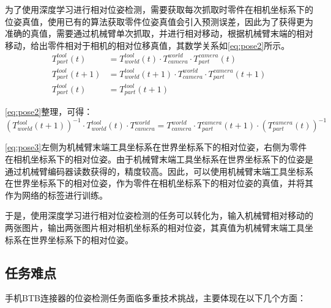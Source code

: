 \documentclass{Diploma}
\begin{document}
为了使用深度学习进行相对位姿检测，需要获取每次抓取时零件在相机坐标系下的位姿真值，使用已有的算法获取零件位姿真值会引入预测误差，因此为了获得更为准确的真值，需要通过机械臂单次抓取，并进行相对移动，根据机械臂末端的相对移动，给出零件相对于相机的相对位移真值，其数学关系如\eqref{eq:pose2}所示。
\begin{equation} \label{eq:pose2}
\begin{aligned} 
  T_{part}^{tool}(t) &= T_{world}^{tool}(t) \cdot T_{camera}^{world} \cdot T_{part}^{camera}(t)  \\
  T_{part}^{tool}(t+1) &= T_{world}^{tool}(t+1) \cdot T_{camera}^{world} \cdot T_{part}^{camera}(t+1) \\
  T_{part}^{tool}(t) &= T_{part}^{tool}(t+1) 
\end{aligned}
\end{equation}

\eqref{eq:pose2}整理，可得：
\begin{equation} \label{eq:pose3}
    (T_{world}^{tool}(t+1))^{-1} \cdot T_{world}^{tool}(t) \cdot T_{camera}^{world} = T_{camera}^{world} \cdot T_{part}^{camera}(t+1) \cdot (T_{part}^{camera}(t))^{-1}
\end{equation}

\eqref{eq:pose3}左侧为机械臂末端工具坐标系在世界坐标系下的相对位姿，右侧为零件在相机坐标系下的相对位姿。由于机械臂末端工具坐标系在世界坐标系下的位姿是通过机械臂编码器读数获得的，精度较高。因此，可以使用机械臂末端工具坐标系在世界坐标系下的相对位姿，作为零件在相机坐标系下的相对位姿的真值，并将其作为网络的标签进行训练。

于是，使用深度学习进行相对位姿检测的任务可以转化为，输入机械臂相对移动的两张图片，输出两张图片相对相机坐标系的相对位姿，其真值为机械臂末端工具坐标系在世界坐标系下的相对位姿。
\subsection{任务难点}
手机BTB连接器的位姿检测任务面临多重技术挑战，主要体现在以下几个方面：
\end{document}
